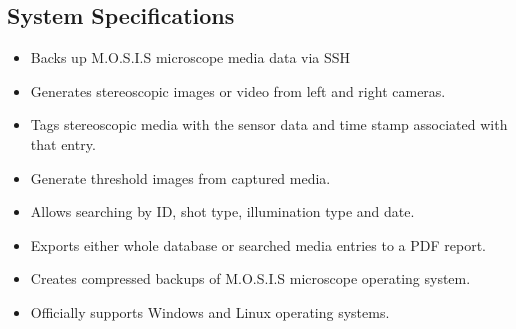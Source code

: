 \documentclass[12pt]{article}
\begin{document}
\subsection{System Specifications}
\begin{itemize}
	\item Backs up M.O.S.I.S microscope media data via SSH
	\item Generates stereoscopic images or video from left and right cameras.
	\item Tags stereoscopic media with the sensor data and time stamp associated with that entry.
	\item Generate threshold images from captured media.
	\item Allows searching by ID, shot type, illumination type and date.
	\item Exports either whole database or searched media entries to a PDF report.
	\item Creates compressed backups of M.O.S.I.S microscope operating system.
	\item Officially supports Windows and Linux operating systems.
\end{itemize}
\end{document}
